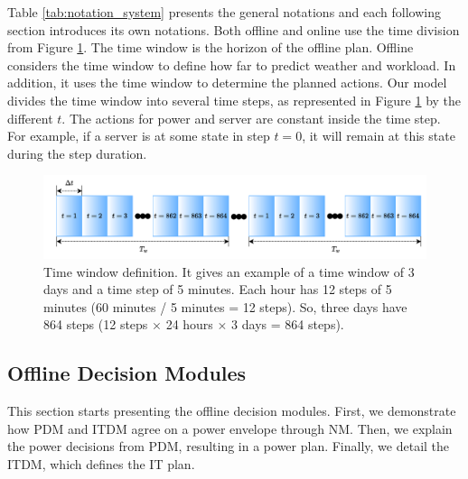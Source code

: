 

Table \ref{tab:notation_system} presents the general notations and each following section introduces its own notations. Both offline and online use the time division from Figure \ref{fig:time_window}. The time window is the horizon of the offline plan. Offline considers the time window to define how far to predict weather and workload. In addition, it uses the time window to determine the planned actions. Our model divides the time window into several time steps, as represented in Figure \ref{fig:time_window} by the different $t$. The actions for power and server are constant inside the time step. For example, if a server is at some state in step $t=0$, it will remain at this state during the step duration.

\begin{figure}[!htb]
    \centering
    \includegraphics[scale=0.75]{Images/Model/Time window.pdf}
    \caption[Time window definition]{Time window definition. It gives an example of a time window of 3 days and a time step of 5 minutes. Each hour has 12 steps of 5 minutes (60 minutes / 5 minutes = 12 steps). So, three days have 864 steps (12 steps $\times$ 24 hours $\times$ 3 days = 864 steps).}
    \label{fig:time_window}
\end{figure}

\subsection{Offline Decision Modules}
\label{sec:offline_modules}

This section starts presenting the offline decision modules. First, we demonstrate how PDM and ITDM agree on a power envelope through NM. Then, we explain the power decisions from PDM, resulting in a power plan. Finally, we detail the ITDM, which defines the IT plan.

